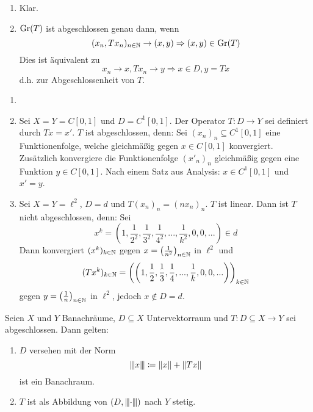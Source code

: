\begin{beweis}
	\begin{enumerate}
		\item Klar.
		\item $ \operatorname{Gr}(T) $ ist abgeschlossen genau dann, wenn \[ (x_n,Tx_n)_{n\in\mathbb{N}}\rightarrow(x,y)\Rightarrow (x,y)\in\operatorname{Gr}(T)\] Dies ist \"aquivalent zu \[ x_n\rightarrow x, Tx_n\rightarrow y\Rightarrow x\in D, y=Tx \]
		d.h. zur Abgeschlossenheit von $ T $.
	\end{enumerate}
	\vspace{-22pt}
\end{beweis}
\newpage
\begin{beispiel*}
	\begin{enumerate}
		\item[]
		\item Sei $ X=Y=C[0,1] $ und $ D=C^1[0,1] $. Der Operator $ T\colon D\rightarrow Y $ sei definiert durch $ Tx=x' $. $ T $ ist abgeschlossen, denn: Sei $ (x_n)_n\subseteq C^1[0,1] $ eine Funktionenfolge, welche gleichm\"a\ss ig gegen $ x\in C[0,1] $ konvergiert. Zus\"atzlich konvergiere die Funktionenfolge $ (x'_n)_n $ gleichm\"a\ss ig gegen eine Funktion $ y\in C[0,1] $. Nach einem Satz aus Analysis: $ x\in C^1[0,1] $ und $ x'=y $.
		\item Sei $ X=Y=\ell^2 $, $ D=d $ und $ T(x_n)_n=(nx_n)_n $. $ T $ ist linear. Dann ist $ T $ nicht abgeschlossen, denn: Sei
		\[ x^k=\left(1,\frac{1}{2^2},\frac{1}{3^2},\frac{1}{4^2},...,\frac{1}{k^2},0,0,...\right)\in d \]
		Dann konvergiert $ (x^k)_{k\in\mathbb{N}} $ gegen $ x=\left(\frac{1}{n^2}\right)_{n\in\mathbb{N}} $ in $ \ell^2 $ und \[ (Tx^k)_{k\in\mathbb{N}}=\left(\left(1,\frac{1}{2},\frac{1}{3},\frac{1}{4},...,\frac{1}{k},0,0,...\right)\right)_{k\in\mathbb{N}} \]
		gegen $ y=\left(\frac{1}{n}\right)_{n\in\mathbb{N}} $ in $ \ell^2 $, jedoch $ x\notin D=d $.
	\end{enumerate}
\end{beispiel*}
\begin{lemma}
	Seien $ X $ und $ Y $ Banachr\"aume, $ D\subseteq X $ Untervektorraum und $ T\colon D\subseteq X\rightarrow Y $ sei abgeschlossen. Dann gelten:
	\begin{enumerate}
		\item $ D $ versehen mit der Norm
		\[ {\left\vert\kern-0.25ex\left\vert\kern-0.25ex\left\vert x \right\vert\kern-0.25ex\right\vert\kern-0.25ex\right\vert}\coloneqq\left\|x\right\|+\left\|Tx\right\| \]
		ist ein Banachraum.
		\item $ T $ ist als Abbildung von $ (D,{\left\vert\kern-0.25ex\left\vert\kern-0.25ex\left\vert \cdot \right\vert\kern-0.25ex\right\vert\kern-0.25ex\right\vert}) $ nach $ Y $ stetig.
	\end{enumerate}
\end{lemma}

